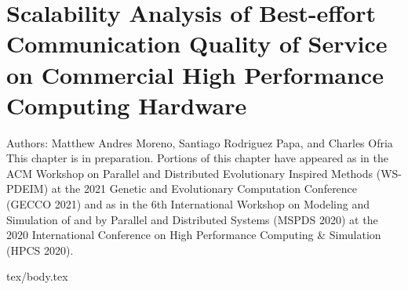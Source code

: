 \chapter{Scalability Analysis of Best-effort Communication Quality of Service on Commercial High Performance Computing Hardware}
\label{ch:conduit}

\noindent
Authors: Matthew Andres Moreno, Santiago Rodriguez Papa, and Charles Ofria \\
This chapter is in preparation.
Portions of this chapter have appeared as \citep{moreno2021conduit} in the ACM Workshop on Parallel and Distributed Evolutionary Inspired Methods (WS-PDEIM) at the 2021 Genetic and Evolutionary Computation Conference (GECCO 2021) and as \citep{moreno2020conduit} in the 6th International Workshop on Modeling and Simulation of and by Parallel and Distributed Systems (MSPDS 2020) at the 2020 International Conference on High Performance Computing \& Simulation (HPCS 2020).

{tex/body.tex}
